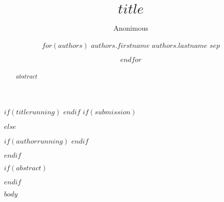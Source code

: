\documentclass[runningheads,$language$]{llncs}
\begin{document}
%
\title{$title$}
%
$if(titlerunning)$  $endif$
%
$if(submission)$
\author{Anonimous}
$else$
\author{
$for(authors)$
$authors.firstname$ $authors.lastname$ $sep$\and
$endfor$
}
$if(authorrunning)$  $endif$

$endif$

%
\maketitle
%

$if(abstract)$\begin{abstract} $abstract$ \end{abstract}$endif$ 



$body$
%
%
%
% 

% 
%

%
\end{document}
